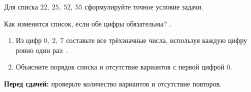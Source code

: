 \begin{practicebox}
  Для списка \(22,\ 25,\ 52,\ 55\) сформулируйте точное условие задачи.

  Как изменится список, если обе цифры обязательны?
  \answerblank[50mm].
\end{practicebox}

\begin{checkpointbox}[7. Итог]
  \begin{enumerate}[label=\textbf{\arabic*.}]
    \item Из цифр \(0,\ 2,\ 7\) составьте все трёхзначные числа, используя
      каждую цифру ровно один раз:
      \answerblank[82mm].
    \item Объясните порядок списка и отсутствие вариантов с первой цифрой 0.
  \end{enumerate}
  \textbf{Перед сдачей:} проверьте количество вариантов и отсутствие повторов.
\end{checkpointbox}
